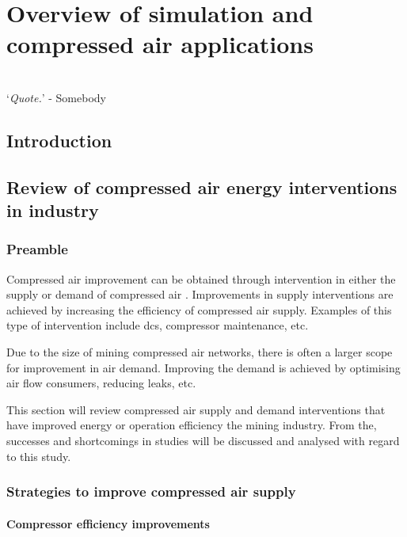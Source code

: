 \chapter{Overview of simulation and compressed air applications}
\thispagestyle{empty}
\vspace{38em}
\hrulefill
\\
\enquote*{\textit{Quote.}} - Somebody\\
\clearpage
\section{Introduction}
\clearpage
\section{Review of compressed air energy interventions in industry}
	\subsection{Preamble}
		Compressed air improvement can be obtained through intervention in either the supply or demand of compressed air \cite{Kriel2014Masters}. Improvements in supply interventions are achieved by increasing the efficiency of compressed air supply. Examples of this type of intervention include \gls{dcs}, compressor maintenance, etc. 
		\par
		Due to the size of mining compressed air networks, there is often a larger scope for improvement in air demand. Improving the demand is achieved by optimising air flow consumers, reducing leaks, etc.
		\par
	 	 This section will review compressed air supply and demand interventions that have improved energy or operation efficiency the mining industry. From the, successes and shortcomings in studies will be discussed and analysed with regard to this study.
	 	
	\subsection{Strategies to improve compressed air supply}

		\subsubsection{Compressor efficiency improvements}
